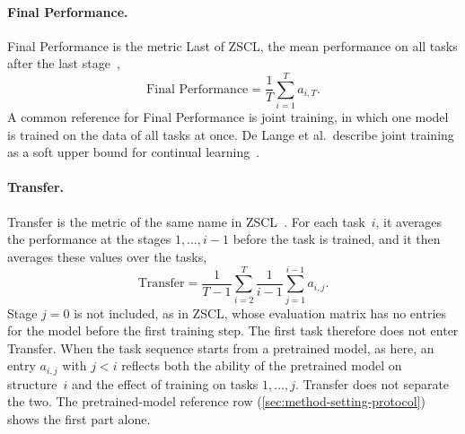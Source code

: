 \paragraph{Final Performance.}
Final Performance is the metric Last of ZSCL, the mean performance on all tasks after the last stage~\cite[Sec.~4, Fig.~4b]{zheng2023preventingzeroshottransferdegradation},
\begin{equation}
\text{Final Performance} = \frac{1}{T} \sum_{i=1}^{T} a_{i,T}.
\label{eq:bg-final}
\end{equation}
A common reference for Final Performance is joint training, in which one model is trained on the data of all tasks at once.
De Lange et al.\ describe joint training as a soft upper bound for continual learning~\cite[Sec.~6.2.1]{delange2022}.

\paragraph{Transfer.}
Transfer is the metric of the same name in ZSCL~\cite[Sec.~4, Fig.~4b]{zheng2023preventingzeroshottransferdegradation}.
For each task~$i$, it averages the performance at the stages $1, \dots, i-1$ before the task is trained, and it then averages these values over the tasks,
\begin{equation}
\text{Transfer} = \frac{1}{T-1} \sum_{i=2}^{T} \frac{1}{i-1} \sum_{j=1}^{i-1} a_{i,j}.
\label{eq:bg-transfer}
\end{equation}
Stage $j = 0$ is not included, as in ZSCL, whose evaluation matrix has no entries for the model before the first training step.
The first task therefore does not enter Transfer.
When the task sequence starts from a pretrained model, as here, an entry $a_{i,j}$ with $j < i$ reflects both the ability of the pretrained model on structure~$i$ and the effect of training on tasks $1, \dots, j$.
Transfer does not separate the two.
The pretrained-model reference row (\cref{sec:method-setting-protocol}) shows the first part alone.

